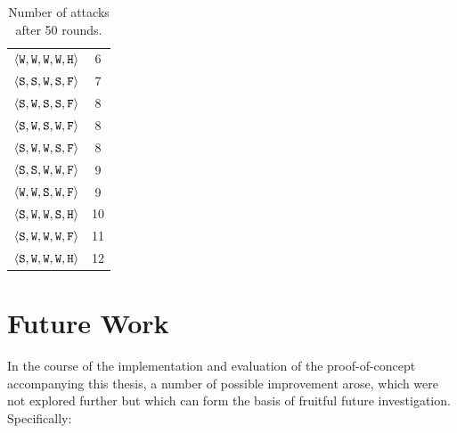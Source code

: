 \begin{table}
{{\begin{minipage}[b]{0.42\hsize}
\begin{tabular}{ l | c }
						$\langle \mathtt{W},\mathtt{W}, \mathtt{W}, \mathtt{W}, \mathtt{H} \rangle$ & 6\\
						$\langle \mathtt{S},\mathtt{S}, \mathtt{W}, \mathtt{S}, \mathtt{F} \rangle$ & 7\\
						$\langle \mathtt{S},\mathtt{W}, \mathtt{S}, \mathtt{S}, \mathtt{F} \rangle$ & 8\\
						$\langle \mathtt{S},\mathtt{W}, \mathtt{S}, \mathtt{W}, \mathtt{F} \rangle$ & 8\\
						$\langle \mathtt{S},\mathtt{W}, \mathtt{W}, \mathtt{S}, \mathtt{F} \rangle$ & 8\\
						$\langle \mathtt{S},\mathtt{S}, \mathtt{W}, \mathtt{W}, \mathtt{F} \rangle$ & 9\\
						$\langle \mathtt{W},\mathtt{W}, \mathtt{S}, \mathtt{W}, \mathtt{F} \rangle$ & 9\\
						$\langle \mathtt{S},\mathtt{W}, \mathtt{W}, \mathtt{S}, \mathtt{H} \rangle$ & 10\\
						$\langle \mathtt{S},\mathtt{W}, \mathtt{W}, \mathtt{W}, \mathtt{F} \rangle$ & 11\\
						$\langle \mathtt{S},\mathtt{W}, \mathtt{W}, \mathtt{W}, \mathtt{H} \rangle$ & 12\\
				\end{tabular}
				\caption{Number of attacks after 50 rounds.}
				\label{tab:numAttacks}
			\end{minipage}
			\hfill
		}}
\end{table}

\section{Future Work}\label{sec:futureWork}

In the course of the implementation and evaluation of the proof-of-concept accompanying this thesis, a number of possible improvement arose, which were not explored further but which can form the basis of fruitful future investigation. Specifically:

